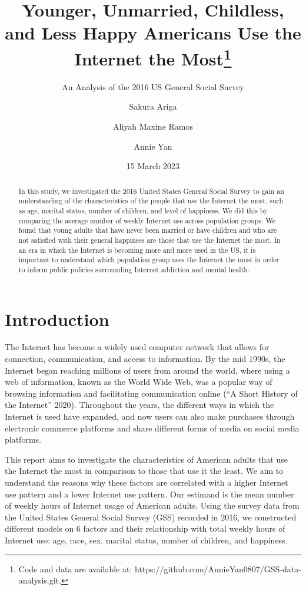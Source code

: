 \documentclass[
]{article}
\title{Younger, Unmarried, Childless, and Less Happy Americans Use the
Internet the Most\thanks{Code and data are available at:
https://github.com/AnnieYan0807/GSS-data-analysis.git.}}
\subtitle{An Analysis of the 2016 US General Social Survey}
\author{Sakura Ariga \and Aliyah Maxine Ramos \and Annie Yan}
\date{15 March 2023}
\begin{document}
\maketitle
\begin{abstract}
In this study, we investigated the 2016 United States General Social
Survey to gain an understanding of the characteristics of the people
that use the Internet the most, such as age, marital status, number of
children, and level of happiness. We did this by comparing the average
number of weekly Internet use across population groups. We found that
young adults that have never been married or have children and who are
not satisfied with their general happiness are those that use the
Internet the most. In an era in which the Internet is becoming more and
more used in the US, it is important to understand which population
group uses the Internet the most in order to inform public policies
surrounding Internet addiction and mental health.
\end{abstract}
\ifdefined\Shaded\renewenvironment{Shaded}{\begin{tcolorbox}[sharp corners, breakable, interior hidden, borderline west={3pt}{0pt}{shadecolor}, enhanced, frame hidden, boxrule=0pt]}{\end{tcolorbox}}\fi

\hypertarget{introduction}{%
\section{Introduction}\label{introduction}}

The Internet has become a widely used computer network that allows for
connection, communication, and access to information. By the mid 1990s,
the Internet began reaching millions of users from around the world,
where using a web of information, known as the World Wide Web, was a
popular way of browsing information and facilitating communication
online ({``A Short History of the Internet''} 2020). Throughout the
years, the different ways in which the Internet is used have expanded,
and now users can also make purchases through electronic commerce
platforms and share different forms of media on social media platforms.

This report aims to investigate the characteristics of American adults
that use the Internet the most in comparison to those that use it the
least. We aim to understand the reasons why these factors are correlated
with a higher Internet use pattern and a lower Internet use pattern. Our
estimand is the mean number of weekly hours of Internet usage of
American adults. Using the survey data from the United States General
Social Survey (GSS) recorded in 2016, we constructed different models on
6 factors and their relationship with total weekly hours of Internet
use: age, race, sex, marital status, number of children, and happiness.
\end{document}
